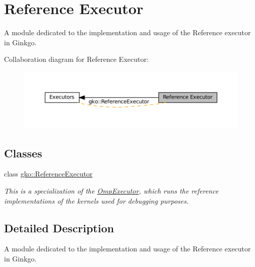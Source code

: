 \hypertarget{group__exec__ref}{}\section{Reference Executor}
\label{group__exec__ref}


A module dedicated to the implementation and usage of the Reference executor in Ginkgo.  


Collaboration diagram for Reference Executor\+:
\nopagebreak
\begin{figure}[H]
\begin{center}
\leavevmode
\includegraphics[width=350pt]{group__exec__ref}
\end{center}
\end{figure}
\subsection*{Classes}
\begin{DoxyCompactItemize}
\item 
class \hyperlink{classgko_1_1ReferenceExecutor}{gko\+::\+Reference\+Executor}
\begin{DoxyCompactList}\small\item\em This is a specialization of the \hyperlink{classgko_1_1OmpExecutor}{Omp\+Executor}, which runs the reference implementations of the kernels used for debugging purposes. \end{DoxyCompactList}\end{DoxyCompactItemize}


\subsection{Detailed Description}
A module dedicated to the implementation and usage of the Reference executor in Ginkgo. 

